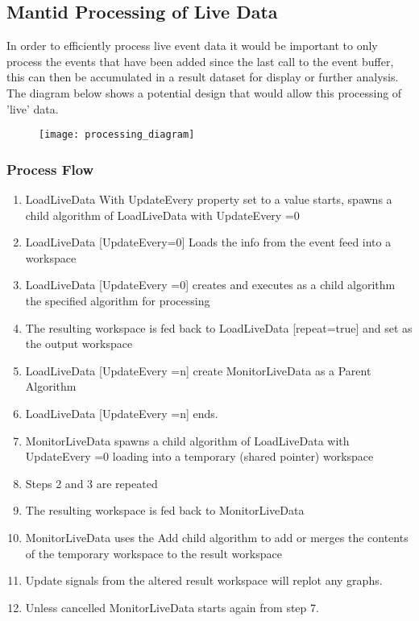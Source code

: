\subsection{Mantid Processing of Live Data}

In order to efficiently process live event data it would be important to only process the events that have been added since the last call to the event buffer, this can then be accumulated in a result dataset for display or further analysis. The diagram below shows a potential design that would allow this processing of 'live' data.

\begin{figure}[h!]
\centering
\texttt{[image: processing\_diagram]}
\end{figure}

\subsubsection{Process Flow}
\begin{enumerate}
\item LoadLiveData With UpdateEvery property set to a value starts, spawns a child algorithm of LoadLiveData with UpdateEvery =0
\item LoadLiveData [UpdateEvery=0] Loads the info from the event feed into a workspace
\item LoadLiveData [UpdateEvery =0] creates and executes as a child algorithm the specified algorithm for processing
\item The resulting workspace is fed back to LoadLiveData [repeat=true] and set as the output workspace
\item LoadLiveData [UpdateEvery =n] create MonitorLiveData as a Parent Algorithm
\item LoadLiveData [UpdateEvery =n] ends.
\item MonitorLiveData  spawns a child algorithm of LoadLiveData with UpdateEvery =0 loading into a temporary (shared pointer) workspace
\item Steps 2 and 3 are repeated
\item The resulting workspace is fed back to MonitorLiveData
\item MonitorLiveData uses the Add child algorithm to add or merges the contents of the temporary workspace 
to the result workspace
\item Update signals from the altered result workspace will replot any graphs.
\item Unless cancelled MonitorLiveData starts again from step 7.
\end{enumerate}

